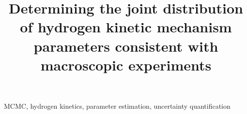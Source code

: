\documentclass[preprint,3p,times,twocolumn]{elsarticle}
\begin{document}
\begin{frontmatter}




\title{Determining the joint distribution of hydrogen kinetic
  mechanism parameters consistent with macroscopic experiments}
\author{}



\begin{abstract}
  
\end{abstract}

\begin{keyword}
  MCMC, hydrogen kinetics, parameter estimation, uncertainty
  quantification
\end{keyword}

\end{frontmatter}

\begin{abstract}
\end{abstract}
\vspace{.1in}

\end{document}
